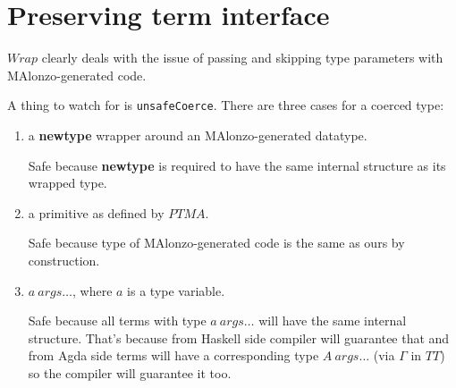 \section{Preserving term interface}

\(Wrap\) clearly deals with the issue of passing and skipping type parameters with
MAlonzo-generated code.

A thing to watch for is \texttt{unsafeCoerce}.  There are three cases for a coerced type:
\begin{enumerate}
\item a \textbf{newtype} wrapper around an MAlonzo-generated datatype.

   Safe because \textbf{newtype} is required to have the same
   internal structure as its wrapped type.

\item a primitive as defined by \(PTMA\).

   Safe because type of MAlonzo-generated code is the same as ours by construction.

\item \(a\ args\ldots\), where \(a\) is a type variable.

   Safe because all terms with type \(a\ args\ldots\) will have the same internal
   structure. That's because from Haskell side compiler will guarantee that and
   from Agda side terms will have a corresponding type \(A\ args\ldots\) (via \(\Gamma\) in \(TT\))
   so the compiler will guarantee it too.
\end{enumerate}

